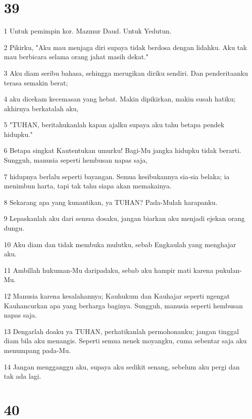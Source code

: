\chapter{39}

\par 1 Untuk pemimpin kor. Mazmur Daud. Untuk Yedutun.
\par 2 Pikirku, "Aku mau menjaga diri supaya tidak berdosa dengan lidahku. Aku tak mau berbicara selama orang jahat masih dekat."
\par 3 Aku diam seribu bahasa, sehingga merugikan diriku sendiri. Dan penderitaanku terasa semakin berat;
\par 4 aku dicekam kecemasan yang hebat. Makin dipikirkan, makin susah hatiku; akhirnya berkatalah aku,
\par 5 "TUHAN, beritahukanlah kapan ajalku supaya aku tahu betapa pendek hidupku."
\par 6 Betapa singkat Kautentukan umurku! Bagi-Mu jangka hidupku tidak berarti. Sungguh, manusia seperti hembusan napas saja,
\par 7 hidupnya berlalu seperti bayangan. Semua kesibukannya sia-sia belaka; ia menimbun harta, tapi tak tahu siapa akan memakainya.
\par 8 Sekarang apa yang kunantikan, ya TUHAN? Pada-Mulah harapanku.
\par 9 Lepaskanlah aku dari semua dosaku, jangan biarkan aku menjadi ejekan orang dungu.
\par 10 Aku diam dan tidak membuka mulutku, sebab Engkaulah yang menghajar aku.
\par 11 Ambillah hukuman-Mu daripadaku, sebab aku hampir mati karena pukulan-Mu.
\par 12 Manusia karena kesalahannya; Kauhukum dan Kauhajar seperti ngengat Kauhancurkan apa yang berharga baginya. Sungguh, manusia seperti hembusan napas saja.
\par 13 Dengarlah doaku ya TUHAN, perhatikanlah permohonanku; jangan tinggal diam bila aku menangis. Seperti semua nenek moyangku, cuma sebentar saja aku menumpang pada-Mu.
\par 14 Jangan mengganggu aku, supaya aku sedikit senang, sebelum aku pergi dan tak ada lagi.

\chapter{40}

